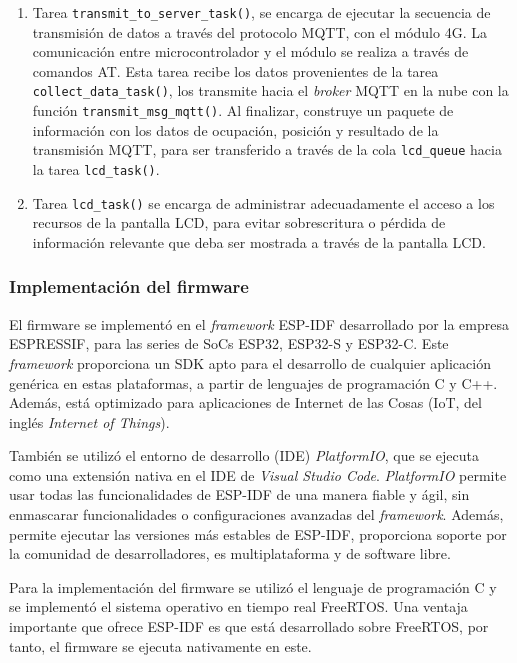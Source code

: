 \begin{enumerate}
	\item Tarea \verb|transmit_to_server_task()|, se encarga de ejecutar la secuencia de transmisión de datos a través del protocolo MQTT, con el módulo 4G. La comunicación entre microcontrolador y el módulo se realiza a través de comandos AT. Esta tarea recibe los datos provenientes de la tarea \verb|collect_data_task()|, los transmite hacia el \textit{broker} MQTT en la nube con la función \verb|transmit_msg_mqtt()|. Al finalizar, construye un paquete de información con los datos de ocupación, posición y resultado de la transmisión MQTT, para ser transferido a través de la cola \verb|lcd_queue| hacia la tarea \verb|lcd_task()|. 
		
	\item Tarea \verb|lcd_task()| se encarga de administrar adecuadamente el acceso a los recursos de la pantalla LCD, para evitar sobrescritura o pérdida de información relevante que deba ser mostrada a través de la pantalla LCD. 
\end{enumerate}



\subsubsection{Implementación del firmware}
\label{sec:implementacion_firmware}

El firmware se implementó en el \textit{framework} ESP-IDF desarrollado por la empresa ESPRESSIF, para las series de SoCs ESP32, ESP32-S y ESP32-C. Este \textit{framework} proporciona un SDK apto para el desarrollo de cualquier aplicación genérica en estas plataformas, a partir de lenguajes de programación C y C++. Además, está optimizado para aplicaciones de Internet de las Cosas (IoT, del inglés \textit{Internet of Things}). 

También se utilizó el entorno de desarrollo (IDE) \textit{PlatformIO}, que se ejecuta como una extensión nativa en el IDE de \textit{Visual Studio Code}. \textit{PlatformIO} permite usar todas las funcionalidades de ESP-IDF de una manera fiable y ágil, sin enmascarar funcionalidades o configuraciones avanzadas del \textit{framework}. Además, permite ejecutar las versiones más estables de ESP-IDF, proporciona soporte por la comunidad de desarrolladores, es multiplataforma y de software libre. 

Para la implementación del firmware se utilizó el lenguaje de programación C y se implementó el sistema operativo en tiempo real FreeRTOS. Una ventaja importante que ofrece ESP-IDF es que está desarrollado sobre FreeRTOS, por tanto, el firmware se ejecuta nativamente en este.


